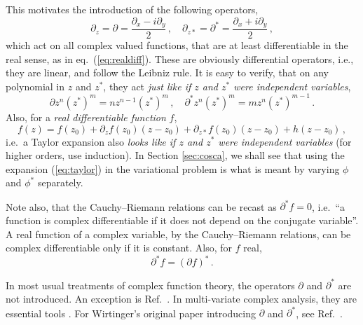 \documentclass[a4paper,11pt]{article}
\begin{document}
This motivates the introduction of the following operators,
\begin{equation}
  \label{eq:wirtinger}
  \partial_{z}=\partial=\frac{\partial_x -i\partial_y}{2}\,,\quad \partial_{z*}=\partial^*=\frac{\partial_x +i\partial_y}{2}\,,
\end{equation}
which act on all complex valued functions, that are at least differentiable in the real sense, as in eq.\ (\ref{eq:realdiff}). These are obviously differential operators, i.e., they
are linear, and follow the Leibniz rule. It is easy to verify, that on any polynomial in $z$ and $z^*$, they act {\sl just like if $z$ and $z^*$ were independent variables},
\begin{equation}
  \label{eq:poly}
    \partial z^n (z^*)^m = n z^{n-1} (z^*)^m\,,\quad \partial^* z^n (z^*)^m = m z^n (z^*)^{m-1}\,.
\end{equation}
Also, for a {\sl real differentiable function} $f$,
\begin{equation}
  \label{eq:taylor}
  f(z) = f(z_0) + \partial_z f(z_0) (z-z_0) + \partial_{z*} f(z_0)(z-z_0) + h(z-z_0)\,,
\end{equation}
i.e.\ a Taylor expansion also {\sl looks like if $z$ and $z^*$ were independent variables} (for higher orders, use induction).
In Section \ref{sec:cosca}, we shall see that using the expansion (\ref{eq:taylor}) in the variational problem is what is meant by varying $\phi$ and $\phi^*$ separately.

Note also, that the Cauchy--Riemann relations can be recast as $\partial^* f=0$, i.e.\ ``a function is complex differentiable if it does not depend on the conjugate variable''.
A real function of a complex variable, by the Cauchy--Riemann relations, can be complex differentiable only if it is constant. Also, for $f$ real,
\begin{equation}
  \label{eq:realf}
  \partial^* f = (\partial f)^*\,.
\end{equation}

In most usual treatments of complex function theory, the operators $\partial$ and $\partial^*$ are not introduced. An exception is Ref.\ \cite{remmert}. In multi-variate complex
analysis, they are essential tools \cite{SC}. For Wirtinger's original paper introducing $\partial$ and $\partial^*$, see Ref.\ \cite{wirt}.
\end{document}
